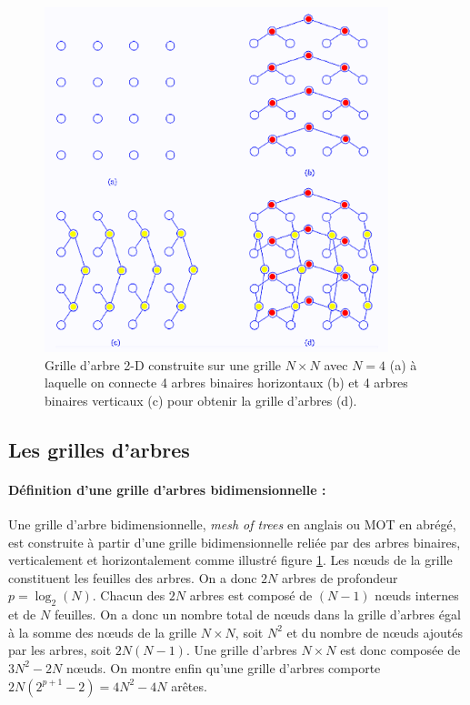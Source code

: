 \begin{figure}[htp]
  \centering
  \includegraphics[width=10cm]{images/gda}
  \caption{Grille d'arbre 2-D construite sur une grille $N \times N$ avec $N = 4$ (a) à laquelle on connecte 4 arbres binaires horizontaux (b) et 
  4 arbres binaires verticaux (c) pour obtenir la grille d'arbres (d).}
  \label{fig:gda}
\end{figure}
\subsection{Les grilles d'arbres}

\paragraph{Définition d'une grille d'arbres bidimensionnelle :}
Une grille d'arbre bidimensionnelle, \textit{mesh of trees} en anglais ou MOT en abrégé, est construite à partir d'une grille
bidimensionnelle reliée par des arbres binaires, verticalement et horizontalement comme illustré figure \ref{fig:gda}.
Les nœuds de la grille constituent les feuilles des arbres. On a donc $2N$ arbres de profondeur $p = \log_2(N)$.
Chacun des $2N$ arbres est composé de $(N-1)$ nœuds internes et de $N$ feuilles. On a donc un nombre total de nœuds dans la grille
d'arbres égal à la somme des nœuds de la grille $N \times N$, soit $N^2$ et du nombre de nœuds ajoutés par les arbres, soit $2N(N-1)$. 
Une grille d'arbres $N\times N$ est donc composée de $3N^2 - 2N$ nœuds. On montre enfin qu'une grille d'arbres comporte $2N(2^{p+1}-2) = 4N^2-4N$ arêtes.



